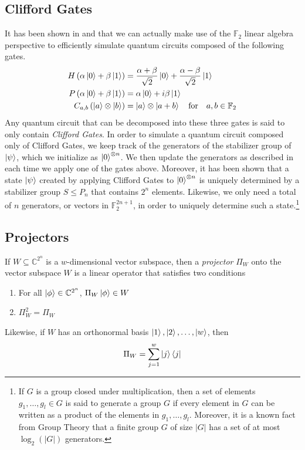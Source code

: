 \documentclass[11pt]{article}
\theoremstyle{definition}
\theoremstyle{plain}
\begin{document}
\subsection{Clifford Gates}\label{clifford_gates}
It has been shown in {\cite{nc}} and {\cite{aaronson}} that we can actually make use of the $\mathbb{F}_2$ linear algebra perspective to efficiently simulate quantum circuits composed of the following gates.
\begin{align}
  H \left( \alpha \ket{0} + \beta \ket{1} \right)
  &= \frac{\alpha + \beta}{\sqrt{2}} \ket{0}
    + \frac{\alpha - \beta}{\sqrt{2}} \ket{1} \label{cg_1}\\
  P \left( \alpha \ket{0} + \beta \ket{1} \right) &= \alpha \ket{0}
    + i \beta \ket{1} \\
  C_{a,b}\left( \ket{a} \otimes \ket{b} \right) &= \ket{a} \otimes \ket{a + b}
    \quad \text{for} \quad a, b \in \mathbb{F}_2 \label{cg_2}
\end{align}
Any quantum circuit that can be decomposed into these three gates is said to only contain \emph{Clifford Gates}. In order to simulate a quantum circuit composed only of Clifford Gates, we keep track of the generators of the stabilizer group of $\ket{\psi}$, which we initialize as $\ket{0}^{\otimes n}$. We then update the generators as described in {\cite{aaronson}} each time we apply one of the gates above. Moreover, it has been shown that a state $\ket{\psi}$ created by applying Clifford Gates to $\ket{0}^{\otimes n}$ is uniquely determined by a stabilizer group $S \leq P_n$ that contains $2^n$ elements. Likewise, we only need a total of $n$ generators, or vectors in $\mathbb{F}_2^{2n+1}$, in order to uniquely determine such a state.\footnote{If $G$ is a group closed under multiplication, then a set of elements $g_1, \ldots, g_l \in G$ is said to generate a group $G$ if every element in $G$ can be written as a product of the elements in $g_1, \ldots, g_l$. Moreover, it is a known fact from Group Theory that a finite group $G$ of size $|G|$ has a set of at most $\log_2(|G|)$ generators. }

\subsection{Projectors}
If $W \subseteq \mathbb{C}^{2^n}$ is a $w$-dimensional vector subspace, then a \emph{projector} $\Pi_W$ onto the vector subspace $W$ is a linear operator that satisfies two conditions
\begin{enumerate}[label = (\arabic*)]
\item\label{p_cond_1}
  For all $\ket{\phi} \in \mathbb{C}^{2^n}$, $\Pi_W \ket{\phi} \in W$ 
\item\label{p_cond_2} $\Pi_W^2 = \Pi_W$ 
\end{enumerate} 
Likewise, if $W$ has an orthonormal basis $\ket{1}, \ket{2}, \ldots, \ket{w}$, then
\begin{equation}\label{proj_1}
  \Pi_W = \sum\limits_{j=1}^w \ket{j}\bra{j}
\end{equation}
\end{document}
